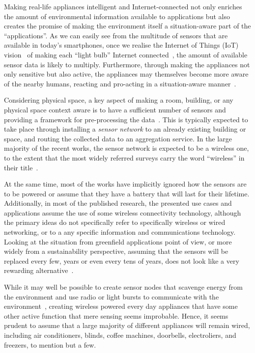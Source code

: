 \documentclass{siamltex}
\begin{document}
Making real-life appliances intelligent and Internet-connected not
only enriches the amount of environmental information available to
applications but also creates the promise of making the environment
itself a situation-aware part of the ``applications''.  As we can
easily see from the multitude of sensors that are available in today's
smartphones, once we realise the Internet of Things (IoT)
vision~\cite{Atzori20102787} of making each ``light bulb'' Internet
connected~\cite{cerf1997next}, the amount of available sensor data is
likely to multiply.  Furthermore, through making the appliances not
only sensitive but also active, the appliances may themselves become
more aware of the nearby humans, reacting and pro-acting in a
situation-aware manner~\cite{kindberg2002people}.

Considering physical space, a key aspect of making a room, building,
or any physical space context aware is to have a sufficient number of
sensors and providing a framework for pre-processing the
data~\cite{Baldauf2007a}.  This is typically expected to take place
through installing a {\it sensor network} to an already existing
building or space, and routing the collected data to an aggregation
service.  In the large majority of the recent works, the sensor
network is expected to be a wireless one, to the extent that the most
widely referred surveys carry the word ``wireless'' in their
title~\cite{akkaya2005survey, akyildiz2002wireless}.

At the same time, most of the works have implicitly ignored how the
sensors are to be powered or assume that they have a battery that will
last for their lifetime.  Additionally, in most of the published
research, the presented use cases and applications assume the use of
some wireless connectivity technology, although the primary ideas do
not specifically refer to specifically wireless or wired networking,
or to a any specific information and communications technology.
Looking at the situation from greenfield applications point of view,
or more widely from a sustainability perspective, assuming that the
sensors will be replaced every few, years or even every tens of years, does
not look like a very rewarding alternative~\cite{rowland2002prevalence}.

While it may well be possible to create sensor nodes that scavenge
energy from the environment and use radio or light bursts to
communicate with the environment~\cite{wang2010toward}, creating
wireless powered every day appliances that have some other active
function that mere sensing seems improbable.  Hence, it seems prudent
to assume that a large majority of different appliances will remain
wired, including air conditioners, blinds, coffee machines, doorbells,
electroliers, and freezers, to mention but a few.
\end{document}

